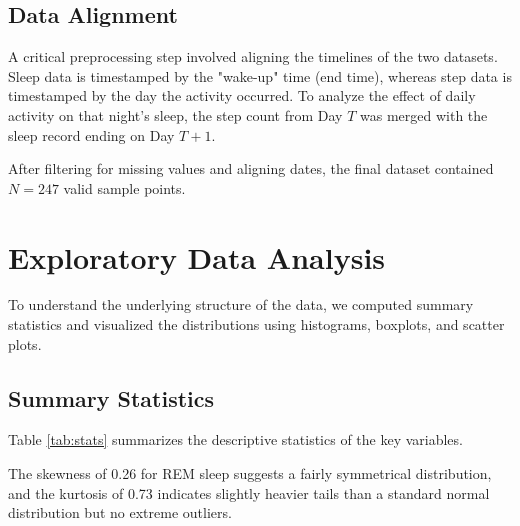 \documentclass[conference]{IEEEtran}
\begin{document}
\subsection{Data Alignment}
A critical preprocessing step involved aligning the timelines of the two datasets. Sleep data is timestamped by the "wake-up" time (end time), whereas step data is timestamped by the day the activity occurred. To analyze the effect of daily activity on that night's sleep, the step count from Day $T$ was merged with the sleep record ending on Day $T+1$.

After filtering for missing values and aligning dates, the final dataset contained $N=247$ valid sample points.

\section{Exploratory Data Analysis}
To understand the underlying structure of the data, we computed summary statistics and visualized the distributions using histograms, boxplots, and scatter plots.

\subsection{Summary Statistics}
Table \ref{tab:stats} summarizes the descriptive statistics of the key variables.

\begin{table}[H]
\centering
\caption{Summary Statistics}
\label{tab:stats}
\end{table}

The skewness of 0.26 for REM sleep suggests a fairly symmetrical distribution, and the kurtosis of 0.73 indicates slightly heavier tails than a standard normal distribution but no extreme outliers.
\end{document}
